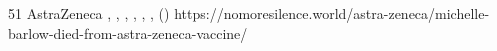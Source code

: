           {
          }
          {
            51
          }
          {
            AstraZeneca
          }
          {
          }
          {
            ,
            ,
            ,
            ,
            ,
            ,
             ()
          }
          {https://nomoresilence.world/astra-zeneca/michelle-barlow-died-from-astra-zeneca-vaccine/}


